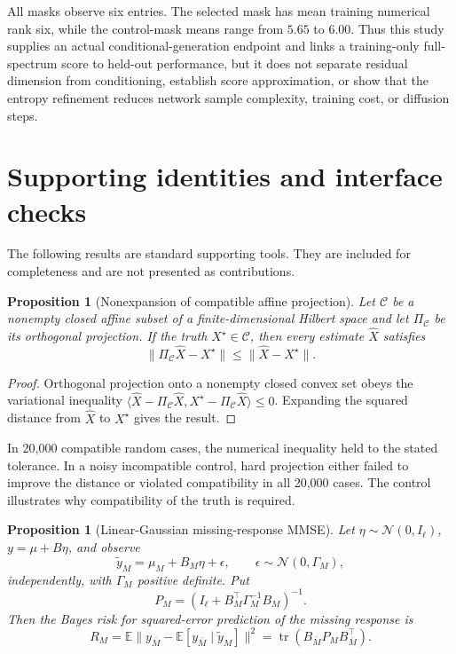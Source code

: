 \documentclass[11pt]{article}
\newtheorem{proposition}[theorem]{Proposition}
\theoremstyle{definition}
\begin{document}
All masks observe six entries.  The selected mask has mean training numerical
rank six, while the control-mask means range from $5.65$ to $6.00$.  Thus this
study supplies an actual conditional-generation endpoint and links a
training-only full-spectrum score to held-out performance, but it does not
separate residual dimension from conditioning, establish score approximation,
or show that the entropy refinement reduces network sample complexity,
training cost, or diffusion steps.

\section{Supporting identities and interface checks}

The following results are standard supporting tools.  They are included for
completeness and are not presented as contributions.

\begin{proposition}[Nonexpansion of compatible affine projection]
\label{prop:projection}
Let $\mathcal C$ be a nonempty closed affine subset of a finite-dimensional
Hilbert space and let $\Pi_{\mathcal C}$ be its orthogonal projection.  If the
truth $X^\star\in\mathcal C$, then every estimate $\widehat X$ satisfies
\[
 \|\Pi_{\mathcal C}\widehat X-X^\star\|
 \le\|\widehat X-X^\star\|.
\]
\end{proposition}

\begin{proof}
Orthogonal projection onto a nonempty closed convex set obeys the variational
inequality
$\langle\widehat X-\Pi_{\mathcal C}\widehat X,
X^\star-\Pi_{\mathcal C}\widehat X\rangle\le0$.  Expanding the squared
distance from $\widehat X$ to $X^\star$ gives the result.
\end{proof}

In 20,000 compatible random cases, the numerical inequality held to the stated
tolerance.  In a noisy incompatible control, hard projection either failed to
improve the distance or violated compatibility in all 20,000 cases.  The
control illustrates why compatibility of the truth is required.

\begin{proposition}[Linear-Gaussian missing-response MMSE]
\label{prop:mmse}
Let $\eta\sim\mathcal N(0,I_\ell)$,
$y=\mu+B\eta$, and observe
\[
 \widetilde y_M=\mu_M+B_M\eta+\epsilon,
 \qquad \epsilon\sim\mathcal N(0,\Gamma_M),
\]
independently, with $\Gamma_M$ positive definite.  Put
\[
 P_M=(I_\ell+B_M^\top\Gamma_M^{-1}B_M)^{-1}.
\]
Then the Bayes risk for squared-error prediction of the missing response is
\[
 R_M=\mathbb E\|y_{\bar M}-\mathbb E[y_{\bar M}\mid\widetilde y_M]\|^2
 =\operatorname{tr}(B_{\bar M}P_MB_{\bar M}^\top).
\]
\end{proposition}
\end{document}
